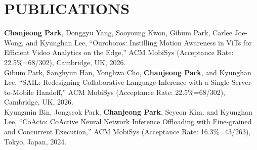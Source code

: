\section*{PUBLICATIONS}

\noindent
\textbf{Chanjeong Park}, Donggyu Yang, Sooyoung Kwon, Gibum Park, Carlee Joe-Wong, and Kyunghan Lee, 
``Ouroboros: Instilling Motion Awareness in ViTs for Efficient Video Analytics on the Edge,''
ACM MobiSys (Acceptance Rate: 22.5\%=68/302), Cambridge, UK, 2026. \\

\noindent
Gibum Park, Sanghyun Han, Yonghwa Cho, \textbf{Chanjeong Park}, and Kyunghan Lee, 
``SAIL: Redesigning Collaborative Language Inference with a Single Server-to-Mobile Handoff,''
ACM MobiSys (Acceptance Rate: 22.5\%=68/302), Cambridge, UK, 2026. \\

\noindent
Kyungmin Bin, Jongseok Park, \textbf{Chanjeong Park}, Seyeon Kim, and Kyunghan Lee, 
``CoActo: CoActive Neural Network Inference Offloading with Fine-grained and Concurrent Execution,''
ACM MobiSys (Acceptance Rate: 16.3\%=43/263), Tokyo, Japan, 2024. \\
